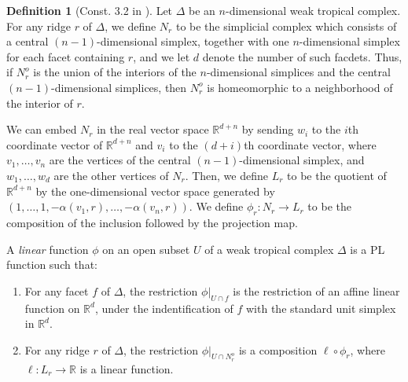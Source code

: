 \documentclass[11pt]{amsart}
\theoremstyle{definition}
\newtheorem{defn}[thm]{Definition}
\newcommand{\defi}[1]{\emph{#1}}
\newcommand{\RR}{\mathbb R}
\begin{document}
\begin{defn}[Const. 3.2 in \cite{cartwright-complexes}]\label{d:linear}
Let $\Delta$ be an $n$-dimensional weak tropical complex. For any ridge $r$ of
$\Delta$, we define $N_r$ to be the simplicial complex which consists of a
central $(n-1)$-dimensional simplex, together with one $n$-dimensional simplex
for each facet containing $r$, and we let $d$ denote the number of such facdets.
Thus, if $N_r^o$ is the union of the interiors of the $n$-dimensional simplices
and the central $(n-1)$-dimensional simplices, then $N_r^o$ is homeomorphic to a
neighborhood of the interior of $r$.

We can embed $N_r$ in the real vector space $\RR^{d+n}$ by sending $w_i$ to the
$i$th coordinate vector of $\RR^{d+n}$ and $v_i$ to the $(d+i)$th coordinate
vector, where $v_1, \ldots, v_n$ are the vertices of the central
$(n-1)$-dimensional simplex, and $w_1, \ldots, w_d$ are the other vertices of
$N_r$. Then, we define $L_r$ to be the quotient of $\RR^{d+n}$ by the
one-dimensional vector space generated by $(1, \ldots, 1, -\alpha(v_1, r),
\ldots, -\alpha(v_n,r))$. We define $\phi_r \colon N_r \rightarrow L_r$ to be
the composition of the inclusion followed by the projection map.

A \defi{linear} function $\phi$ on an open subset $U$ of a weak tropical complex
$\Delta$ is a PL function such that:
\begin{enumerate}
\item For any facet $f$ of $\Delta$, the restriction $\phi \vert_{U \cap f}$
is the restriction of an affine linear function on $\RR^d$, under the
indentification of $f$ with the standard unit simplex in $\RR^d$.
\item For any ridge $r$ of $\Delta$, the restriction $\phi \vert_{U \cap N_r^o}$
is a composition $\ell \circ \phi_r$, where $\ell \colon L_r \rightarrow \RR$ is
a linear function.
\end{enumerate}
\end{defn}
\end{document}
